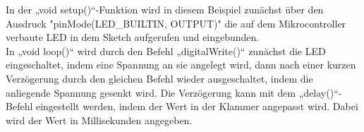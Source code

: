 In der „void setup()“-Funktion wird in diesem Beispiel zunächst über den Ausdruck "pinMode(LED_BUILTIN, OUTPUT)" die auf dem Mikrocontroller verbaute LED in dem Sketch aufgerufen und eingebunden.\\
In „void loop()“ wird durch den Befehl „digitalWrite()“ zunächst die LED eingeschaltet, indem eine Spannung an sie angelegt wird, dann nach einer kurzen Verzögerung durch den gleichen Befehl wieder ausgeschaltet, indem die anliegende Spannung gesenkt wird. Die Verzögerung kann mit dem „delay()“-Befehl eingestellt werden, indem der Wert in der Klammer angepasst wird. Dabei wird der Wert in Millisekunden angegeben.
